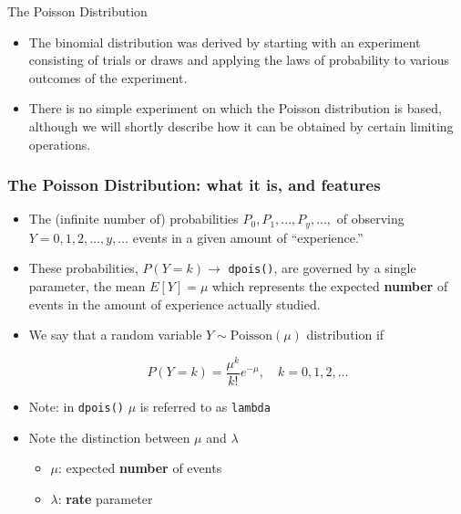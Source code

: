 \documentclass{beamer}\usepackage[]{graphicx}\usepackage[]{color}
\begin{document}
\begin{frame}{The Poisson Distribution}


\begin{itemize}
	\setlength\itemsep{1em}
	\item The binomial distribution was derived by starting with an experiment consisting of trials or draws and applying the laws of probability to various outcomes of the experiment. \pause 
	\item There is no simple experiment on which the Poisson distribution is based, although we will shortly describe how it can be obtained by certain limiting operations.
\end{itemize}

\end{frame}

\begin{frame}
\frametitle{The Poisson Distribution: what it is, and features}

\begin{itemize}
	\small
	\setlength\itemsep{1em}
\item The (infinite number of) probabilities $P_{0}, P_{1}, ..., P_{y}, ..., $ of observing 
$Y = 0, 1, 2, \dots , y, \dots $ events in a given amount of ``experience.'' \pause

\item These probabilities, $P(Y = k) \to$ \texttt{dpois()}, are governed by a single parameter, the mean $E[Y] = \mu$ which represents the expected \textbf{number} of events in the amount of experience actually studied.\pause 

\item We say that a random variable $Y \sim \textrm{Poisson}(\mu)$ distribution if 

\[ P(Y=k) = \frac{\mu^k}{k!}e^{-\mu}, \quad k = 0, 1, 2, \ldots\]
\pause 

\item Note: in \texttt{dpois()} $\mu$ is referred to as \texttt{lambda}

\item Note the distinction between $\mu$ and $\lambda$
\begin{itemize}
	\item $\mu$: expected \textbf{number} of events
	\item $\lambda$: \textbf{rate} parameter
\end{itemize}
\end{itemize}
\end{frame}
\end{document}
